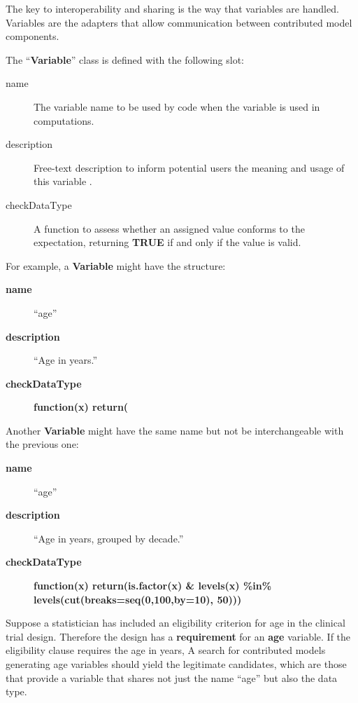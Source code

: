 \documentclass[12pt]{amsart}
\newcommand{\Rcode}[1]{{\textbf{#1}}}
\begin{document}
The key to interoperability and sharing is the way that variables are handled.
Variables are the adapters that allow communication between 
contributed model components.

The  ``\Rcode{Variable}'' class is defined with  the following slot:
\begin{description}
\item[name ] The variable name to be used by code when the variable is used in computations.
\item[description] Free-text description to inform potential users the meaning and usage of this variable .
\item[checkDataType]  A function to assess whether an assigned value conforms to the
expectation, returning \Rcode{TRUE} if and only if the value is valid.
\end{description}

For example, a \Rcode{Variable} might have the structure:
\begin{description}
\item[ \Rcode{name}] ``age''  
\item[ \Rcode{description}] ``Age in years.'' 
\item[ \Rcode{checkDataType}] \Rcode{function(x) return(} \linebreak \Rcode{is.numeric(x) \& (x $>$= 0))}
\end{description}
Another \Rcode{Variable} might have the same name but not be interchangeable with the 
previous one:
\begin{description}
\item[ \Rcode{name}] ``age''  
\item[ \Rcode{description}] ``Age in years, grouped by decade.'' 
\item[ \Rcode{checkDataType}] 
	\Rcode{function(x) return(is.factor(x)
	 \& levels(x) \%in\%  levels(cut(breaks=seq(0,100,by=10), 50)))}
\end{description}
Suppose a statistician has included an eligibility criterion for age in the clinical trial design.
Therefore the design has a \Rcode{requirement} for an \Rcode{age} variable.
If the eligibility clause requires the age in years,
A search for contributed models generating age variables should yield
the legitimate candidates, which are those that provide a variable that 
shares not just the name ``age''
but also the data type. 
\end{document}
